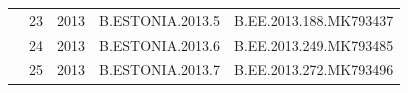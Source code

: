 \begin{table}[htbp]
\begin{tabular}{|cllll|}
\multicolumn{1}{|c|}{}                                   & \multicolumn{1}{l|}{23}          & \multicolumn{1}{l|}{2013}          & \multicolumn{1}{l|}{B.ESTONIA.2013.5}   & B.EE.2013.188.MK793437          \\ \cline{2-5} 
\multicolumn{1}{|c|}{}                                   & \multicolumn{1}{l|}{24}          & \multicolumn{1}{l|}{2013}          & \multicolumn{1}{l|}{B.ESTONIA.2013.6}   & B.EE.2013.249.MK793485          \\ \cline{2-5} 
\multicolumn{1}{|c|}{}                                   & \multicolumn{1}{l|}{25}          & \multicolumn{1}{l|}{2013}          & \multicolumn{1}{l|}{B.ESTONIA.2013.7}   & B.EE.2013.272.MK793496          \\ \hline
\end{tabular}
\end{table}

